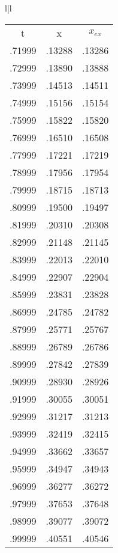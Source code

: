 \begin{figure}
    \centering
    \begin{tabular}{l|l}
        \begin{tabular}{ccc}
            t &  x  & $x_{ex}$ \\
            .71999 & .13288 & .13286 \\
            .72999 & .13890 & .13888 \\
            .73999 & .14513 & .14511 \\
            .74999 & .15156 & .15154 \\
            .75999 & .15822 & .15820 \\
            .76999 & .16510 & .16508 \\
            .77999 & .17221 & .17219 \\
            .78999 & .17956 & .17954 \\
            .79999 & .18715 & .18713 \\
            .80999 & .19500 & .19497 \\
            .81999 & .20310 & .20308 \\
            .82999 & .21148 & .21145 \\
            .83999 & .22013 & .22010 \\
            .84999 & .22907 & .22904 \\
            .85999 & .23831 & .23828 \\
            .86999 & .24785 & .24782 \\
            .87999 & .25771 & .25767 \\
            .88999 & .26789 & .26786 \\
            .89999 & .27842 & .27839 \\
            .90999 & .28930 & .28926 \\
            .91999 & .30055 & .30051 \\
            .92999 & .31217 & .31213 \\
            .93999 & .32419 & .32415 \\
            .94999 & .33662 & .33657 \\
            .95999 & .34947 & .34943 \\
            .96999 & .36277 & .36272 \\
            .97999 & .37653 & .37648 \\
            .98999 & .39077 & .39072 \\
            .99999 & .40551 & .40546 \\

\end{tabular}
\end{tabular}
\end{figure}
